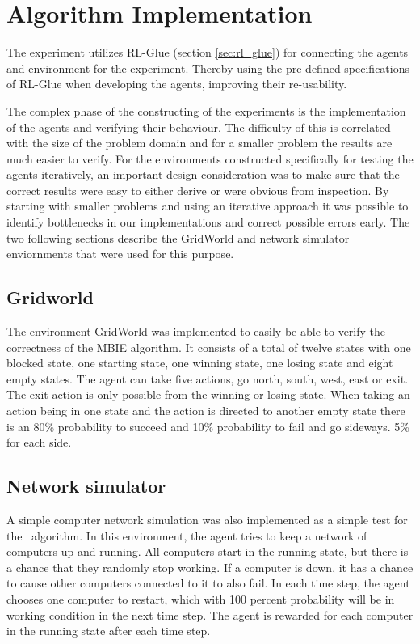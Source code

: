 \section{Algorithm Implementation }
\label{sec:implementation}
The experiment utilizes RL-Glue (section \ref{sec:rl_glue}) for connecting the agents and environment for the experiment. Thereby using the pre-defined specifications of RL-Glue when developing the agents, improving their re-usability. 

The complex phase of the constructing of the experiments is the implementation of the agents and verifying their behaviour. The difficulty of this is correlated with the size of the problem domain and for a smaller problem the results are much easier to verify. For the environments constructed specifically for testing the agents iteratively, an important design consideration was to make sure that the correct results were easy to either derive or were obvious from inspection. By starting with smaller problems and using an iterative approach it was possible to identify bottlenecks in our implementations and correct possible errors early. The two following sections describe the GridWorld and network simulator enviornments that were used for this purpose. 

\subsection{Gridworld }
The environment GridWorld was implemented to easily be able to verify the correctness of the MBIE algorithm. It consists of a total of twelve states with one blocked state, one starting state, one winning state, one losing state and eight empty states. The agent can take five actions, go north, south, west, east or exit. The exit-action is only possible from the winning or losing state. When taking an action being in one state and the action is directed to another empty state there is an 80\% probability to succeed and 10\% probability to fail and go sideways. 5\% for each side. 

\subsection{Network simulator }
A simple computer network simulation was also implemented as a simple test for the \etre\ algorithm. In this environment, the agent tries to keep a network of computers up and running. All computers start in the running state, but there is a chance that they randomly stop working. If a computer is down, it has a chance to cause other computers connected to it to also fail. In each time step, the agent chooses one computer to restart, which with 100 percent probability will be in working condition in the next time step. The agent is rewarded for each computer in the running state after each time step. 
